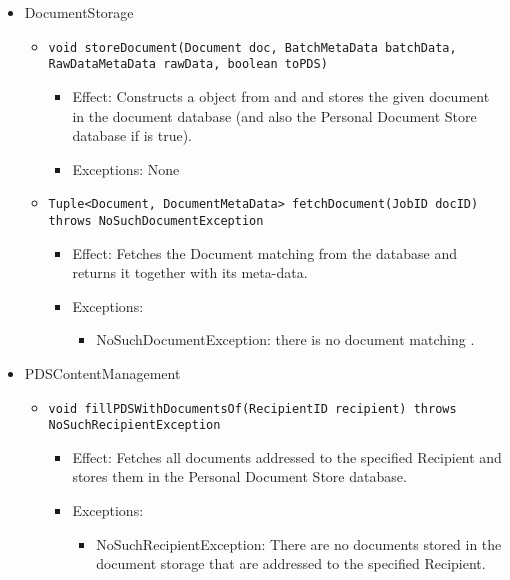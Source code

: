 \begin{itemize}
    \item DocumentStorage
	\begin{itemize}
		\item \texttt{void storeDocument(Document doc, BatchMetaData batchData, RawDataMetaData rawData, boolean toPDS)}
		\begin{itemize}
			\item Effect: Constructs a  object from  and  and stores the given document in the document database (and also the Personal Document Store database if  is true).
			\item Exceptions: None
		\end{itemize}
		
		\item \texttt{Tuple<Document, DocumentMetaData> fetchDocument(JobID docID) throws NoSuchDocumentException}
		\begin{itemize}
			\item Effect: Fetches the Document matching  from the database and returns it together with its meta-data.
			\item Exceptions: 
			\begin{itemize}
				\item NoSuchDocumentException: there is no document matching .
			\end{itemize}
		\end{itemize}
	\end{itemize}

	\item PDSContentManagement
	\begin{itemize}
		\item \texttt{void fillPDSWithDocumentsOf(RecipientID recipient) throws NoSuchRecipientException}
		\begin{itemize}
			\item Effect: Fetches all documents addressed to the specified Recipient and stores them in the Personal Document Store database.
			\item Exceptions:
			\begin{itemize}
				\item NoSuchRecipientException: There are no documents stored in the document storage that are addressed to the specified Recipient.
			\end{itemize}
		\end{itemize}
				

\end{itemize}
\end{itemize}
